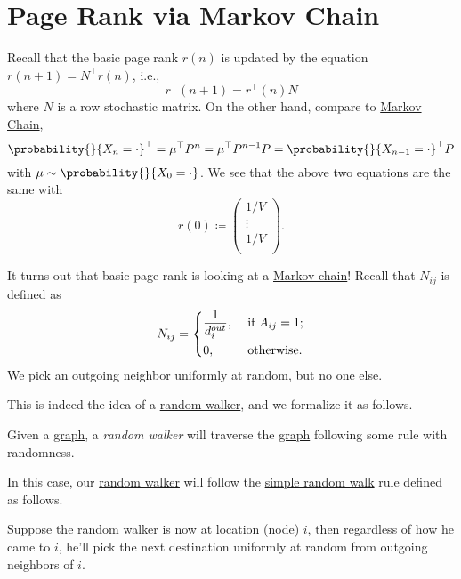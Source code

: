 \section{Page Rank via Markov Chain}
Recall that the basic page rank \(r(n)\) is updated by the equation \(r(n+1) = N^{\top}r(n)\), i.e.,
\[
	r^{\top}(n+1) = r^{\top}(n)N
\]
where \(N\) is a row stochastic matrix. On the other hand, compare to \hyperref[def:Markov-chain]{Markov Chain},
\[
	\probability{}{X_n = \cdot}^{\top} = \mu^{\top}P^n = \mu^{\top}P^{n-1}P = \probability{}{X_{n-1} = \cdot}^{\top}P
\]
with \(\mu\sim \probability{}{X_0 = \cdot}\). We see that the above two equations are the same with
\[
	r(0)\coloneqq \begin{pmatrix}
		1/V    \\
		\vdots \\
		1/V    \\
	\end{pmatrix}.
\]

\begin{remark}
	It turns out that basic page rank is looking at a \hyperref[def:Markov-chain]{Markov chain}! Recall that \(N_{ij}\) is defined as
	\[
		N_{ij} = \begin{dcases}
			\frac{1}{d_i^{out}}, & \text{ if }A_{ij}= 1; \\
			0,                   & \text{ otherwise}.
		\end{dcases}
	\]
	We pick an outgoing neighbor uniformly at random, but no one else.
\end{remark}

This is indeed the idea of a \hyperref[def:random-walker]{random walker}, and we formalize it as follows.
\begin{definition}\label{def:random-walker}
	Given a \hyperref[def:graph]{graph}, a \emph{random walker} will traverse the \hyperref[def:graph]{graph} following some rule
	with randomness.
\end{definition}

In this case, our \hyperref[def:random-walker]{random walker} will follow the \hyperref[def:simple-random-walk]{simple random walk} rule
defined as follows.
\begin{definition}\label{def:simple-random-walk}
	Suppose the \hyperref[def:random-walker]{random walker} is now at location (node) \(i\), then regardless of how he came to \(i\),
	he'll pick the next destination uniformly at random from outgoing neighbors of \(i\).
	\begin{figure}[H]
		\centering
		\label{fig:random-walker}
	\end{figure}
\end{definition}


